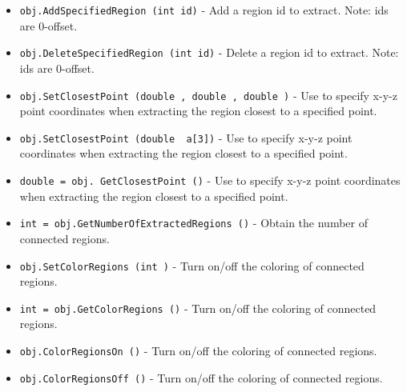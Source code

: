 \begin{itemize}
\item  \verb|obj.AddSpecifiedRegion (int id)| -  Add a region id to extract. Note: ids are 0-offset.

\item  \verb|obj.DeleteSpecifiedRegion (int id)| -  Delete a region id to extract. Note: ids are 0-offset.

\item  \verb|obj.SetClosestPoint (double , double , double )| -  Use to specify x-y-z point coordinates when extracting the region 
 closest to a specified point.

\item  \verb|obj.SetClosestPoint (double  a[3])| -  Use to specify x-y-z point coordinates when extracting the region 
 closest to a specified point.

\item  \verb|double = obj. GetClosestPoint ()| -  Use to specify x-y-z point coordinates when extracting the region 
 closest to a specified point.

\item  \verb|int = obj.GetNumberOfExtractedRegions ()| -  Obtain the number of connected regions.

\item  \verb|obj.SetColorRegions (int )| -  Turn on/off the coloring of connected regions.

\item  \verb|int = obj.GetColorRegions ()| -  Turn on/off the coloring of connected regions.

\item  \verb|obj.ColorRegionsOn ()| -  Turn on/off the coloring of connected regions.

\item  \verb|obj.ColorRegionsOff ()| -  Turn on/off the coloring of connected regions.

\end{itemize}

